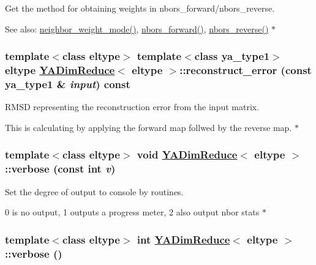 Get the method for obtaining weights in nbors\_\-forward/nbors\_\-reverse. 

\begin{Desc}
\item[See also:]\hyperlink{class_y_a_dim_reduce_a27}{neighbor\_\-weight\_\-mode()}, \hyperlink{class_y_a_dim_reduce_a32}{nbors\_\-forward()}, \hyperlink{class_y_a_dim_reduce_a33}{nbors\_\-reverse()} $\ast$ \end{Desc}
\hypertarget{class_y_a_dim_reduce_a11}{
\subsubsection[reconstruct\_\-error]{\setlength{\rightskip}{0pt plus 5cm}template$<$class eltype$>$ template$<$class ya\_\-type1$>$ eltype \hyperlink{class_y_a_dim_reduce}{YADim\-Reduce}$<$ eltype $>$::reconstruct\_\-error (const ya\_\-type1 \& {\em input}) const}}
\label{class_y_a_dim_reduce_a11}


RMSD representing the reconstruction error from the input matrix. 

This is calculating by applying the forward map follwed by the reverse map. $\ast$ \hypertarget{class_y_a_dim_reduce_a17}{
\subsubsection[verbose]{\setlength{\rightskip}{0pt plus 5cm}template$<$class eltype$>$ void \hyperlink{class_y_a_dim_reduce}{YADim\-Reduce}$<$ eltype $>$::verbose (const int {\em v})}}
\label{class_y_a_dim_reduce_a17}


Set the degree of output to console by routines. 

0 is no output, 1 outputs a progress meter, 2 also output nbor stats $\ast$ \hypertarget{class_y_a_dim_reduce_a16}{
\subsubsection[verbose]{\setlength{\rightskip}{0pt plus 5cm}template$<$class eltype$>$ int \hyperlink{class_y_a_dim_reduce}{YADim\-Reduce}$<$ eltype $>$::verbose ()}}
\label{class_y_a_dim_reduce_a16}


